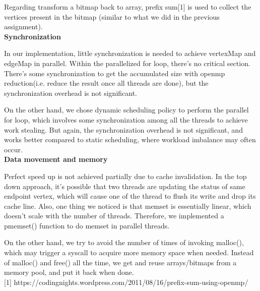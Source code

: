 \documentclass[11pt]{article}
\begin{document}
Regarding transform a bitmap back to array, prefix sum[1] is used to collect the vertices present in the bitmap (similar to what we did in the previous assignment). \\

\textbf{Synchronization}

In our implementation, little synchronization is needed to achieve vertexMap and edgeMap in parallel. Within the parallelized for loop, there's no critical section. There's some synchronization to get the accumulated size with openmp reduction(i.e. reduce the result once all threads are done), but the synchronization overhead is not significant. 

On the other hand, we chose dynamic scheduling policy to perform the parallel for loop, which involves some synchronization among all the threads to achieve work stealing. But again, the synchronization overhead is not significant, and works better compared to static scheduling, where workload imbalance may often occur. \\

\textbf{Data movement and memory}

Perfect speed up is not achieved partially due to cache invalidation. In the top down approach, it's possible that two threads are updating the status of same endpoint vertex, which will cause one of the thread to flush its write and drop its cache line. Also, one thing we noticed is that memset is essentially linear, which doesn't scale with the number of threads. Therefore, we implemented a pmemset() function to do memset in parallel threads. 

On the other hand, we try to avoid the number of times of invoking malloc(), which may trigger a syscall to acquire more memory space when needed. Instead of malloc() and free() all the time, we get and reuse arrays/bitmaps from a memory pool, and put it back when done. \\





[1] https://codingnights.wordpress.com/2011/08/16/prefix-sum-using-openmp/

\clearpage
\end{document}
